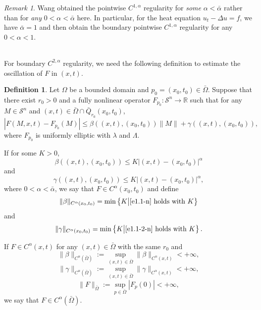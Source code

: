 \documentclass[preprint,12pt]{elsarticle}
\theoremstyle{definition}
\newtheorem{definition}[theorem]{Definition}
\theoremstyle{remark}
\newtheorem{remark}[theorem]{Remark}
\numberwithin{equation}{section}
\begin{document}
\begin{remark}\label{re1.1-ref2}
Wang \cite[Theorem 2.1]{MR1139064} obtained the pointwise $C^{1,\alpha}$ regularity for \emph{some} $\alpha<\bar{\alpha}$ rather than for \emph{any} $0<\alpha< \bar{\alpha}$ here. In particular, for the heat equation $u_t-\Delta u=f$, we have $\bar{\alpha}=1$ and then obtain the boundary pointwise $C^{1,\alpha}$ regularity for any $0<\alpha<1$.
\end{remark}
~\\

For boundary $C^{2,\alpha}$ regularity, we need the following definition to estimate the oscillation of $F$ in $(x,t)$.
\begin{definition}\label{d-FP}
Let  $\Omega$ be a bounded domain and $p_0=(x_0,t_0)\in \bar{\Omega}$. Suppose that there exist $r_0>0$ and a fully nonlinear operator $F_{p_0}:\mathcal{S}^{n}\rightarrow \mathbb{R}$ such that for any $M\in \mathcal{S}^{n}$ and $(x,t)\in \bar\Omega\cap \bar Q_{r_0}(x_0,t_0)$,
\begin{equation}\label{e.C2a.beta}
|F(M,x,t)-F_{p_0}(M)|\leq \beta((x,t),(x_0,t_0))\|M\|+\gamma((x,t),(x_0,t_0)),
\end{equation}
where $F_{p_0}$ is uniformly elliptic with $\lambda$ and $\Lambda$.

If for some $K>0$,
\begin{equation}\label{e1.1-n}
\beta((x,t),(x_0,t_0))\leq K|(x,t)-(x_0,t_0)|^{\alpha}
\end{equation}
and
\begin{equation}\label{e1.1-2-n}
\gamma((x,t),(x_0,t_0))\leq K|(x,t)-(x_0,t_0)|^{\alpha},
\end{equation}
where $0<\alpha<\bar{\alpha}$, we say that $F\in C^{\alpha}(x_0,t_0)$ and define
\begin{equation*}
  \|\beta\|_{C^{\alpha}(x_0,t_0)}=\min \left\{K\big | \cref{e1.1-n} ~\mbox{holds with}~K\right\}
\end{equation*}
and
\begin{equation*}
  \|\gamma\|_{C^{\alpha}(x_0,t_0)}=\min \left\{K\big | \cref{e1.1-2-n} ~\mbox{holds with}~K\right\}.
\end{equation*}

If $F\in C^{\alpha}(x,t)$ for any $(x,t)\in \bar{\Omega}$ with the same $r_0$ and
\begin{equation*}
\|\beta\|_{C^{\alpha}(\bar{\Omega})}:=\sup_{(x,t)\in \bar\Omega} \|\beta\|_{C^{\alpha}(x,t)}<+\infty,
\end{equation*}
\begin{equation*}
\|\gamma\|_{C^{\alpha}(\bar{\Omega})}:=\sup_{(x,t)\in \bar\Omega} \|\gamma\|_{C^{\alpha}(x,t)}<+\infty,
\end{equation*}
\begin{equation*}
\|F\|_{\bar{\Omega}}:=\sup_{p\in \bar\Omega} |F_{p}(0)|<+\infty,
\end{equation*}
we say that $F\in C^{\alpha}(\bar{\Omega})$.
\end{definition}
\end{document}
